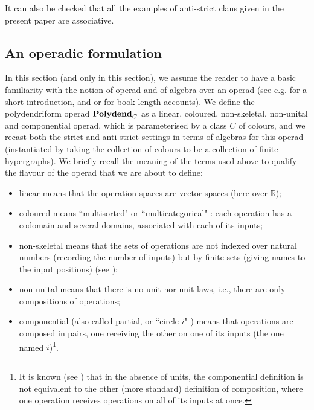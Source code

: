 \documentclass{article}
\theoremstyle{plain}
\theoremstyle{definition}
\begin{document}
It can also be checked that all the examples of anti-strict  clans given in the present paper are associative.

\subsection{An operadic formulation} \label{operadic-section}
In this section (and only in this section), we assume the reader to have a basic familiarity with the notion of operad and of algebra over an operad (see e.g. \cite{MARKL} for a short introduction, and \cite{MSS} or \cite{LV} for book-length accounts). We define the polydendriform operad ${\bf Polydend}_C$ as a linear, coloured, non-skeletal, non-unital and componential operad, which is parameterised  by a class $C$ of colours, and we recast both the strict and anti-strict settings in terms of algebras for this operad (instantiated by taking the collection of colours to be a collection of  finite hypergraphs). We briefly recall the meaning of the terms used above to qualify the flavour of the operad that we are about to  define:

\begin{itemize}
\item linear means that the operation spaces are vector spaces (here over $\mathbb{R}$);
\item coloured means ``multisorted" or ``multicategorical" : each operation has a codomain and several domains, associated with each of its inputs;
\item non-skeletal means that the sets of operations are not indexed over natural numbers (recording the number of inputs) but by finite sets (giving names to the input positions) (see \cite{Obradovic17,MSS});
\item non-unital means that there is no unit nor unit laws, i.e., there are only compositions of operations;
\item componential (also called partial, or ``circle $i$" ) means that operations are composed in pairs, one receiving the other on one of its inputs (the one named $i$)\footnote{It is known (see \cite{MARKL}) that in the absence of units, the componential definition is not equivalent to the other (more standard) definition of composition, where one operation receives operations on all of its inputs at once.}.
\end{itemize}
\end{document}
